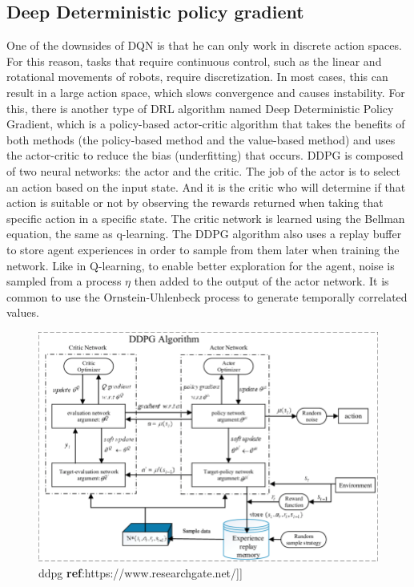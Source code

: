 \documentclass[12pt]{extarticle}
\begin{document}
\pagebreak

\subsection{Deep Deterministic policy gradient }
One of the downsides of DQN is that  he can  only work  in discrete action spaces. For this reason, tasks that require continuous control, such as the linear and rotational movements of robots, require discretization. In most cases, this can result in a large action space, which slows convergence and causes instability.
For this, there is another type of DRL algorithm named Deep Deterministic Policy Gradient, which is a policy-based actor-critic algorithm that takes the benefits of both methods (the policy-based method and the value-based method) and uses the actor-critic to reduce the bias (underfitting) that occurs.
DDPG is composed of two neural networks: the actor and the critic. The job of the actor is to select an action based on the input state. And it is the critic who will determine if that action is suitable or not by observing the rewards returned when taking that specific action in a specific state.
The critic network is learned using the Bellman equation, the same as q-learning.
The DDPG algorithm also uses a replay buffer to store agent experiences in order to sample from them later when training the network.
Like in Q-learning, to enable better exploration for the agent, noise is sampled from a process $\eta$ then added to the output of the actor network. It is common to use the Ornstein-Uhlenbeck process to generate temporally correlated values. \cite{lillicrap2015continuous}


 \begin{figure}[h] 
\centering
\includegraphics[scale=0.45]{ddpg}
\caption[ddpg]{ddpg \textbf{ref}:https://www.researchgate.net/]]}
\end{figure}
\end{document}
